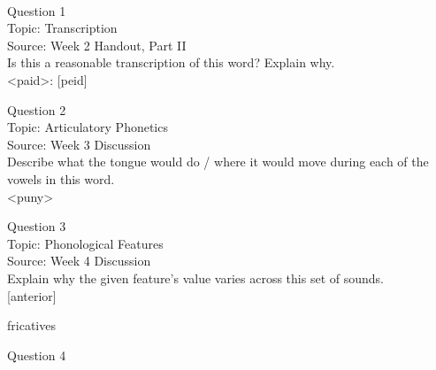 \documentclass[12pt]{article}
\begin{document}
\newpage

\begin{center}
\textbf{{\color{red}{\HUGE END OF EXAM}}}\\

\end{center}
\newpage

\begin{center}
\textbf{{\color{blue}{\HUGE START OF EXAM\\}}}

\textbf{{\color{blue}{\HUGE Student ID: 34236\\}}}

\textbf{{\color{blue}{\HUGE \\}}}

\end{center}
\newpage

{\large Question 1}\\

Topic: Transcription\\
Source: Week 2 Handout, Part II\\

Is this a reasonable transcription of this word? Explain why.\\

<paid>: {[peid]}


\newpage

{\large Question 2}\\

Topic: Articulatory Phonetics\\
Source: Week 3 Discussion\\

Describe what the tongue would do / where it would move during each of the vowels in this word.\\

<puny>


\newpage

{\large Question 3}\\

Topic: Phonological Features\\
Source: Week 4 Discussion\\

Explain why the given feature's value varies across this set of sounds.\\

{[anterior]}

fricatives


\newpage

{\large Question 4}\\
\end{document}
